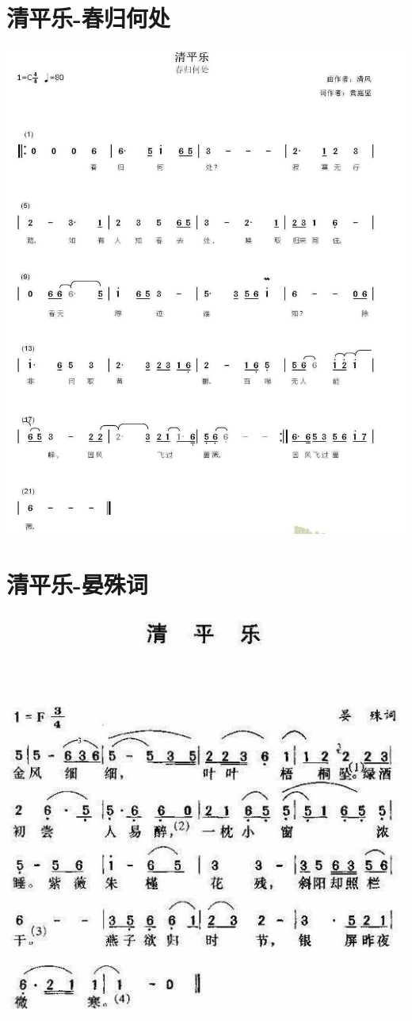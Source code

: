 \documentclass[cn,pad,twocol]{elegantbook}
\begin{document}
\section{清平乐-春归何处}
    \includegraphics[width=\textwidth]{dongxiao/20200411-清平乐-春归何处.jpg}
\section{清平乐-晏殊词}
    \includegraphics[width=\textwidth]{dongxiao/20200411-清平乐-晏殊.jpg}
\end{document}

